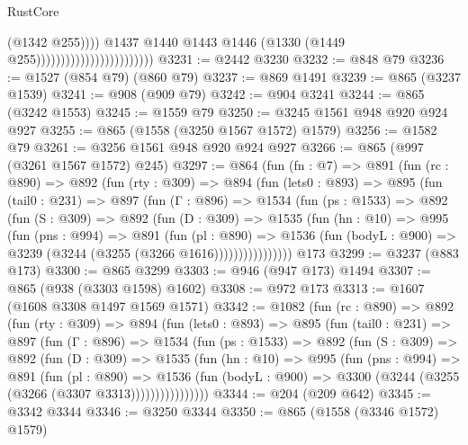 \begin{lexlean}{RustCore}
\begin{coremodule}
                                                      (@1342 @255))))
                                                @1437
                                                @1440
                                                @1443
                                                @1446
                                                (@1330 (@1449 @255))))))))))))))))))))))))
@3231 := @2442 @3230
@3232 := @848 @79
@3236 := @1527 (@854 @79) (@860 @79)
@3237 := @869 @1491
@3239 := @865 (@3237 @1539)
@3241 := @908 (@909 @79)
@3242 := @904 @3241
@3244 := @865 (@3242 @1553)
@3245 := @1559 @79
@3250 := @3245 @1561 @948 @920 @924 @927
@3255 := @865 (@1558 (@3250 @1567 @1572) @1579)
@3256 := @1582 @79
@3261 := @3256 @1561 @948 @920 @924 @927
@3266 := @865 (@997 (@3261 @1567 @1572) @245)
@3297 := @864
    (fun (fn : @7) =>
    @891
      (fun (rc : @890) =>
      @892
        (fun (rty : @309) =>
        @894
          (fun (lets0 : @893) =>
          @895
            (fun (tail0 : @231) =>
            @897
              (fun (Γ : @896) =>
              @1534
                (fun (ps : @1533) =>
                @892
                  (fun (S : @309) =>
                  @892
                    (fun (D : @309) =>
                    @1535
                      (fun (hn : @10) =>
                      @995
                        (fun (pns : @994) =>
                        @891
                          (fun (pl : @890) =>
                          @1536
                            (fun (bodyL : @900) => @3239 (@3244 (@3255 (@3266 @1616))))))))))))))))
    @173
@3299 := @3237 (@883 @173)
@3300 := @865 @3299
@3303 := @946 (@947 @173) @1494
@3307 := @865 (@938 (@3303 @1598) @1602)
@3308 := @972 @173
@3313 := @1607 (@1608 @3308 @1497 @1569 @1571)
@3342 := @1082
    (fun (rc : @890) =>
    @892
      (fun (rty : @309) =>
      @894
        (fun (lets0 : @893) =>
        @895
          (fun (tail0 : @231) =>
          @897
            (fun (Γ : @896) =>
            @1534
              (fun (ps : @1533) =>
              @892
                (fun (S : @309) =>
                @892
                  (fun (D : @309) =>
                  @1535
                    (fun (hn : @10) =>
                    @995
                      (fun (pns : @994) =>
                      @891
                        (fun (pl : @890) =>
                        @1536
                          (fun (bodyL : @900) =>
                          @3300 (@3244 (@3255 (@3266 (@3307 @3313))))))))))))))))
@3344 := @204 (@209 @642)
@3345 := @3342 @3344
@3346 := @3250 @3344
@3350 := @865 (@1558 (@3346 @1572) @1579)

\end{coremodule}
\end{lexlean}
